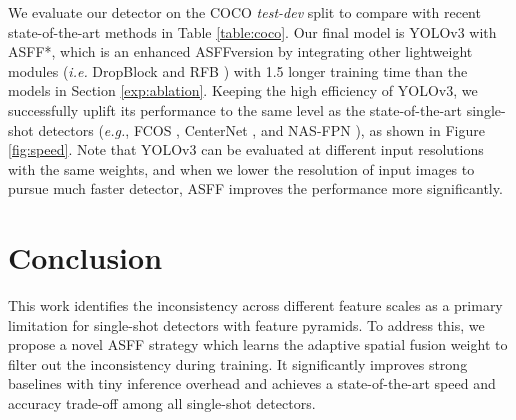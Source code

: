 \documentclass[10pt,twocolumn,letterpaper]{article}
\begin{document}
We evaluate our detector on the COCO \emph{test-dev} split to compare with recent state-of-the-art methods in Table \ref{table:coco}. Our final model is YOLOv3 with ASFF*, which is an enhanced ASFFversion by integrating other lightweight modules (\emph{i.e.} DropBlock \cite{dropblock} and RFB \cite{RFB}) with 1.5 longer training time than the models in Section \ref{exp:ablation}. 
Keeping the high efficiency of YOLOv3, we successfully uplift its performance to the same level as the state-of-the-art single-shot detectors (\emph{e.g.}, FCOS \cite{fcos}, CenterNet \cite{objects}, and NAS-FPN \cite{nas-fpn}), as shown in Figure \ref{fig:speed}. Note that YOLOv3 can be evaluated at different input resolutions with the same weights, and when we lower the resolution of input images to pursue much faster detector, ASFF improves the performance more significantly. 

\section{Conclusion}

This work identifies the inconsistency across different feature scales as a primary limitation for single-shot detectors with feature pyramids. To address this, we propose a novel ASFF strategy which learns the adaptive spatial fusion weight to filter out the inconsistency during training. It significantly improves strong baselines with tiny inference overhead and achieves a state-of-the-art speed and accuracy trade-off among all single-shot detectors.


{\small
	
	
}
\end{document}
